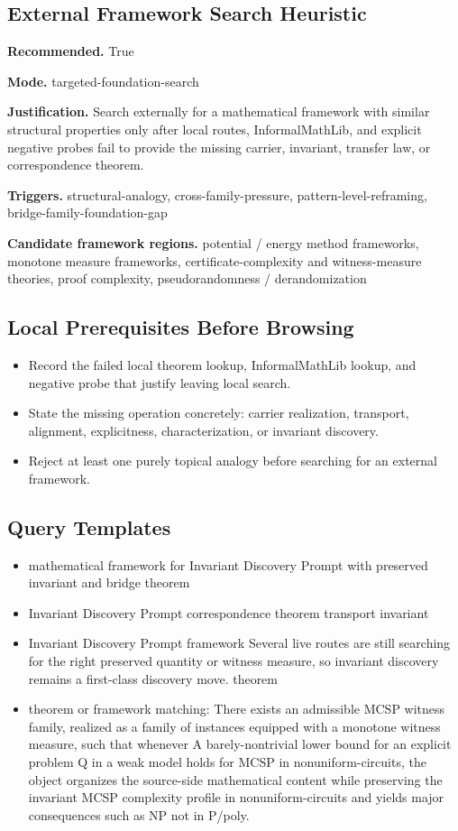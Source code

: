 \documentclass[11pt]{article}
\begin{document}
\subsection*{External Framework Search Heuristic}
\textbf{Recommended.} True

\textbf{Mode.} targeted-foundation-search

\textbf{Justification.} Search externally for a mathematical framework with similar structural properties only after local routes, InformalMathLib, and explicit negative probes fail to provide the missing carrier, invariant, transfer law, or correspondence theorem.

\textbf{Triggers.} structural-analogy, cross-family-pressure, pattern-level-reframing, bridge-family-foundation-gap

\textbf{Candidate framework regions.} potential / energy method frameworks, monotone measure frameworks, certificate-complexity and witness-measure theories, proof complexity, pseudorandomness / derandomization

\subsection*{Local Prerequisites Before Browsing}
\begin{itemize}[leftmargin=*,itemsep=0.2em]
\item Record the failed local theorem lookup, InformalMathLib lookup, and negative probe that justify leaving local search.
\item State the missing operation concretely: carrier realization, transport, alignment, explicitness, characterization, or invariant discovery.
\item Reject at least one purely topical analogy before searching for an external framework.
\end{itemize}
\subsection*{Query Templates}
\begin{itemize}[leftmargin=*,itemsep=0.2em]
\item mathematical framework for Invariant Discovery Prompt with preserved invariant and bridge theorem
\item Invariant Discovery Prompt correspondence theorem transport invariant
\item Invariant Discovery Prompt framework Several live routes are still searching for the right preserved quantity or witness measure, so invariant discovery remains a first-class discovery move. theorem
\item theorem or framework matching: There exists an admissible MCSP witness family, realized as a family of instances equipped with a monotone witness measure, such that whenever A barely-nontrivial lower bound for an explicit problem Q in a weak model holds for MCSP in nonuniform-circuits, the object organizes the source-side mathematical content while preserving the invariant MCSP complexity profile in nonuniform-circuits and yields major consequences such as NP not in P/poly.
\end{itemize}
\end{document}
